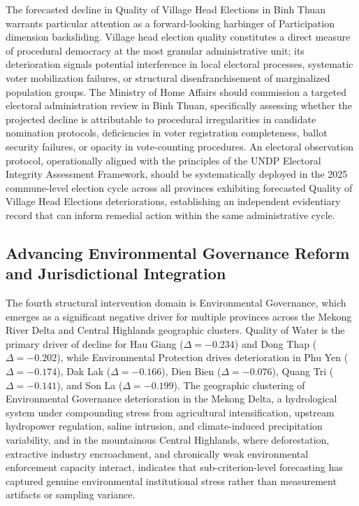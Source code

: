 \documentclass[12pt,a4paper]{article}
\begin{document}
The forecasted decline in Quality of Village Head Elections in Binh Thuan warrants particular attention as a forward-looking harbinger of Participation dimension backsliding. Village head election quality constitutes a direct measure of procedural democracy at the most granular administrative unit; its deterioration signals potential interference in local electoral processes, systematic voter mobilization failures, or structural disenfranchisement of marginalized population groups. The Ministry of Home Affairs should commission a targeted electoral administration review in Binh Thuan, specifically assessing whether the projected decline is attributable to procedural irregularities in candidate nomination protocols, deficiencies in voter registration completeness, ballot security failures, or opacity in vote-counting procedures. An electoral observation protocol, operationally aligned with the principles of the UNDP Electoral Integrity Assessment Framework, should be systematically deployed in the 2025 commune-level election cycle across all provinces exhibiting forecasted Quality of Village Head Elections deteriorations, establishing an independent evidentiary record that can inform remedial action within the same administrative cycle.

\subsection{Advancing Environmental Governance Reform and Jurisdictional Integration}
\label{subsec:policy_environment}

The fourth structural intervention domain is Environmental Governance, which emerges as a significant negative driver for multiple provinces across the Mekong River Delta and Central Highlands geographic clusters. Quality of Water is the primary driver of decline for Hau Giang ($\Delta = -0.234$) and Dong Thap ($\Delta = -0.202$), while Environmental Protection drives deterioration in Phu Yen ($\Delta = -0.174$), Dak Lak ($\Delta = -0.166$), Dien Bien ($\Delta = -0.076$), Quang Tri ($\Delta = -0.141$), and Son La ($\Delta = -0.199$). The geographic clustering of Environmental Governance deterioration in the Mekong Delta, a hydrological system under compounding stress from agricultural intensification, upstream hydropower regulation, saline intrusion, and climate-induced precipitation variability, and in the mountainous Central Highlands, where deforestation, extractive industry encroachment, and chronically weak environmental enforcement capacity interact, indicates that sub-criterion-level forecasting has captured genuine environmental institutional stress rather than measurement artifacts or sampling variance.
\end{document}
